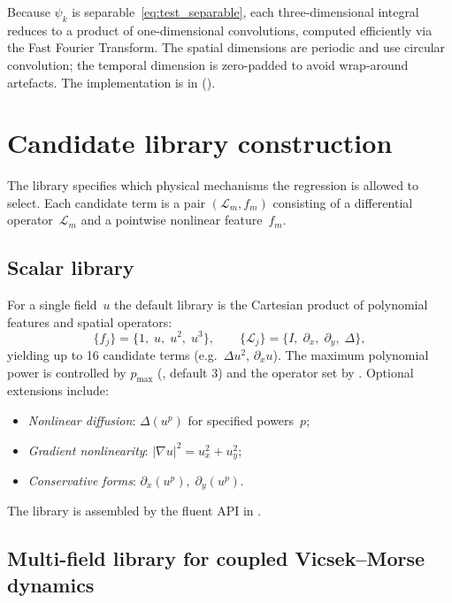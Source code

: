 \documentclass{report}
\theoremstyle{plain}
\theoremstyle{remark}
\numberwithin{equation}{section}              %
\begin{document}
Because $\psi_k$ is separable~\eqref{eq:test_separable}, each
three-dimensional integral reduces to a product of one-dimensional
convolutions, computed efficiently via the Fast Fourier Transform.
The spatial dimensions are periodic and use circular convolution;
the temporal dimension is zero-padded to avoid wrap-around artefacts.
The implementation is in 
().

%
\section{Candidate library construction}
\label{sec:library}

The library specifies which physical mechanisms the regression is allowed
to select.  Each candidate term is a pair $(\mathcal{L}_m, f_m)$
consisting of a differential operator~$\mathcal{L}_m$ and a pointwise
nonlinear feature~$f_m$.

\subsection{Scalar library}
\label{subsec:scalar_library}

For a single field~$u$ the default library is the Cartesian product of
polynomial features and spatial operators:
\begin{equation}
  \bigl\{f_j\bigr\} = \{1,\;u,\;u^2,\;u^3\},
  \qquad
  \bigl\{\mathcal{L}_j\bigr\}
  = \{I,\;\partial_x,\;\partial_y,\;\Delta\},
  \label{eq:scalar_library}
\end{equation}
yielding up to 16 candidate terms (e.g.\ $\Delta u^2$, $\partial_x u$).
The maximum polynomial power is controlled by $p_{\max}$ (,
default 3) and the operator set by .  Optional extensions
include:
\begin{itemize}[nosep]
\item \emph{Nonlinear diffusion}: $\Delta(u^p)$ for specified powers~$p$;
\item \emph{Gradient nonlinearity}: $|\nabla u|^2 = u_x^2+u_y^2$;
\item \emph{Conservative forms}: $\partial_x(u^p),\;\partial_y(u^p)$.
\end{itemize}
The library is assembled by the fluent  API
in .

\subsection{Multi-field library for coupled Vicsek--Morse dynamics}
\label{subsec:multifield_library}
\end{document}
